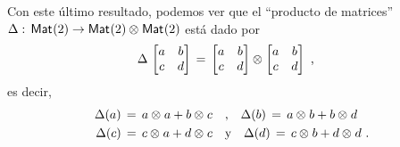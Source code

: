 Con este \'{u}ltimo resultado, podemos ver que el ``producto de matrices''
$\Delta:\,\mathsf{Mat}_{}(2)\rightarrow\mathsf{Mat}_{}(2)\otimes_{}\mathsf{Mat}_{}(2)$ est\'{a} dado por
\begin{align*}
	\Delta\,\begin{bmatrix} a & b \\ c & d \end{bmatrix} & \,=\,
		\begin{bmatrix} a & b \\ c & d \end{bmatrix}\otimes_{}
		\begin{bmatrix} a & b \\ c & d \end{bmatrix}
	\text{ ,}
\end{align*}
%
es decir,
\begin{align*}
	\Delta(a) \,=\,a\otimes_{} a + b\otimes_{} c & \quad\text{,}\quad
	\Delta(b) \,=\,a\otimes_{} b + b\otimes_{} d \\
	\Delta(c) \,=\,c\otimes_{} a + d\otimes_{} c & \quad\text{y}\quad
	\Delta(d) \,=\,c\otimes_{} b + d\otimes_{} d
	\text{ .}
\end{align*}
%

